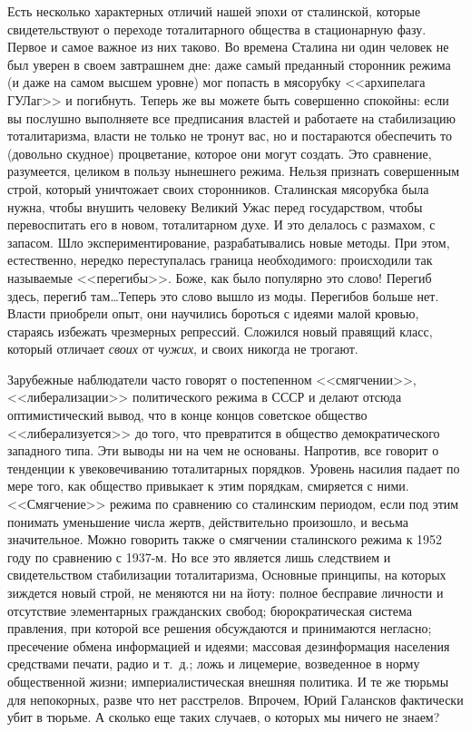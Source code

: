 \documentclass{book}
\begin{document}
Есть несколько характерных отличий нашей эпохи от сталинской, которые свидетельствуют о переходе тоталитарного общества в стационарную фазу. Первое и самое важное из них таково. Во времена Сталина ни один человек не был уверен в своем завтрашнем дне: 
даже самый преданный сторонник режима (и даже на самом высшем уровне) мог попасть в мя­сорубку <<архипелага ГУЛаг>> и погибнуть. 
Теперь же вы мо­жете быть совершенно спокойны: если вы послушно выполня­ете все предписания властей и работаете на стабилизацию 
тота­литаризма, власти не только не тронут вас, но и постараются обеспечить то (довольно скудное) процветание, которое они могут 
создать. Это сравнение, разумеется, целиком в пользу нынешнего режима. Нельзя признать совершенным строй, который уничтожает 
своих сторонников. Сталинская мясорубка была нужна, чтобы внушить человеку Великий Ужас перед государством, чтобы перевоспитать 
его в новом, тоталитарном духе. И это делалось с размахом, с запасом. Шло экспериментирование, разрабатывались новые методы. При 
этом, естественно, нередко переступалась граница необходимого: происходили так называемые <<перегибы>>. Боже, как было популяр­но это слово! Перегиб здесь, перегиб там\ldots Теперь это слово вышло из моды. Перегибов больше нет. Власти приобрели опыт, они научились бороться с идеями малой кровью, стараясь избежать чрезмерных репрессий. Сложился новый правящий класс, который отличает \textit{своих} от \textit{чужих},  и своих  никогда не трогают.

Зарубежные наблюдатели часто говорят о постепенном <<смягчении>>, <<либерализации>> политического режима в СССР и делают отсюда 
оптимистический вывод, что в конце концов советское общество <<либерализуется>> до того, что превратится в общество 
демократического западного типа. Эти выводы ни на чем не основаны. Напротив, все говорит о тенденции к увековечиванию 
тоталитарных порядков. Уровень насилия падает по мере того, как общество привыкает к этим порядкам, смиряется с ними. 
<<Смягчение>> режима по сравнению со сталинским периодом, если под этим понимать уменьшение числа жертв, действительно 
произошло, и весьма значительное. Можно говорить также о смягчении сталинского режима к 1952 году по сравнению с 1937-м. Но все 
это является лишь следствием и свидетельством стабилизации тоталитаризма, Основные принципы, на которых зиждется новый строй, не 
меняются ни на йоту: полное бесправие личности и отсутствие элементарных гражданских свобод; бюрократическая систе­ма правления, 
при которой все решения обсуждаются и при­нимаются негласно; пресечение обмена информацией и идея­ми; массовая дезинформация населения средствами печати, радио и т.~д.; ложь и лицемерие, возведенное в норму общест­венной жизни; империалистическая внешняя политика. И те же тюрьмы для непокорных, разве что нет расстрелов. Впрочем, Юрий Галансков фактически убит в тюрьме. А сколько еще таких случаев, о которых мы ничего не знаем?
\end{document}
